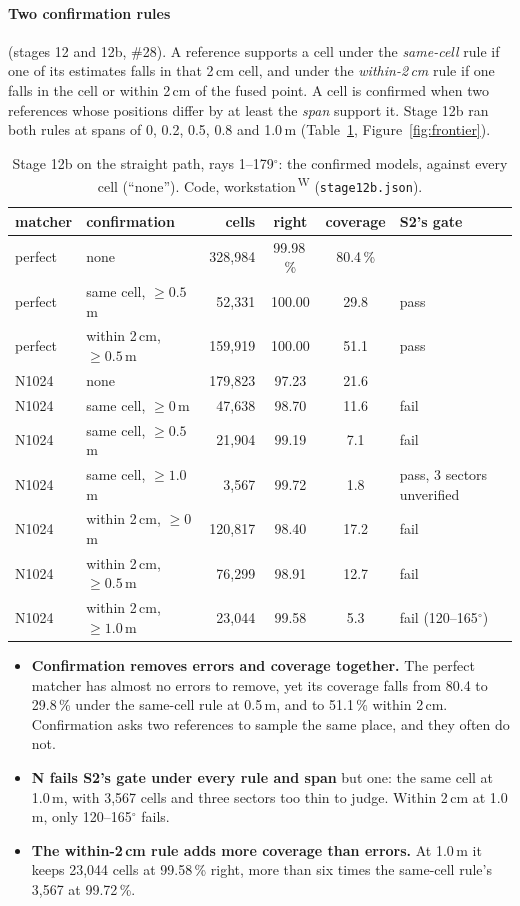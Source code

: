 \documentclass[11pt,a4paper]{article}
\newcommand{\code}[1]{\texttt{\small #1}}
\newcommand{\src}[1]{\textsuperscript{\,#1}}
\newcommand{\WS}{\src{W}}   %
\begin{document}
\paragraph{Two confirmation rules} (stages 12 and 12b, \#28). A reference supports a cell under the \emph{same-cell}
rule if one of its estimates falls in that 2\,cm cell, and under the \emph{within-2\,cm} rule if one falls in the cell or
within 2\,cm of the fused point. A cell is confirmed when two references whose positions differ by at least the
\emph{span} support it. Stage 12b ran both rules at spans of 0, 0.2, 0.5, 0.8 and 1.0\,m (Table~\ref{tab:confirm},
Figure~\ref{fig:frontier}).

\begin{table}[h]
\centering\small
\begin{tabular}{@{}llrccl@{}}
\toprule
matcher & confirmation & cells & right & coverage & S2's gate\\
\midrule
perfect & none & 328,984 & 99.98\,\% & 80.4\,\% & \\
perfect & same cell, $\ge0.5$\,m & 52,331 & 100.00 & 29.8 & pass\\
perfect & within 2\,cm, $\ge0.5$\,m & 159,919 & 100.00 & 51.1 & pass\\
\midrule
N1024 & none & 179,823 & 97.23 & 21.6 & \\
N1024 & same cell, $\ge0$\,m & 47,638 & 98.70 & 11.6 & fail\\
N1024 & same cell, $\ge0.5$\,m & 21,904 & 99.19 & 7.1 & fail\\
N1024 & same cell, $\ge1.0$\,m & 3,567 & 99.72 & 1.8 & pass, 3 sectors unverified\\
N1024 & within 2\,cm, $\ge0$\,m & 120,817 & 98.40 & 17.2 & fail\\
N1024 & within 2\,cm, $\ge0.5$\,m & 76,299 & 98.91 & 12.7 & fail\\
N1024 & within 2\,cm, $\ge1.0$\,m & 23,044 & 99.58 & 5.3 & fail (120--165$^\circ$)\\
\bottomrule
\end{tabular}
\caption{Stage 12b on the straight path, rays 1--179$^\circ$: the confirmed models, against every cell (``none''). Code,
workstation\WS{} (\code{stage12b.json}).}\label{tab:confirm}
\end{table}

\begin{itemize}
\item \textbf{Confirmation removes errors and coverage together.} The perfect matcher has almost no errors to remove,
  yet its coverage falls from 80.4 to 29.8\,\% under the same-cell rule at 0.5\,m, and to 51.1\,\% within 2\,cm.
  Confirmation asks two references to sample the same place, and they often do not.
\item \textbf{N fails S2's gate under every rule and span} but one: the same cell at 1.0\,m, with 3,567 cells and three
  sectors too thin to judge. Within 2\,cm at 1.0\,m, only 120--165$^\circ$ fails.
\item \textbf{The within-2\,cm rule adds more coverage than errors.} At 1.0\,m it keeps 23,044 cells at 99.58\,\% right,
  more than six times the same-cell rule's 3,567 at 99.72\,\%.
\end{itemize}
\end{document}
